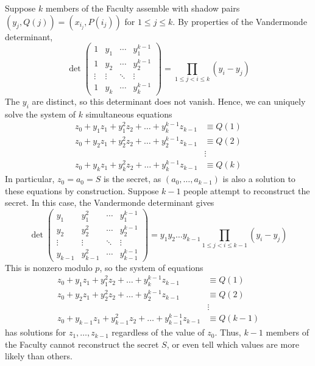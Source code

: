 Suppose \( k \) members of the Faculty assemble with shadow pairs \( (y_j, Q(j)) = (x_{i_j}, P(i_j)) \) for \( 1 \leq j \leq k \).
By properties of the Vandermonde determinant,
\[ \det\begin{pmatrix}
    1 & y_1 & \cdots & y_1^{k-1} \\
    1 & y_2 & \cdots & y_2^{k-1} \\
    \vdots & \vdots & \ddots & \vdots \\
    1 & y_k & \cdots & y_k^{k-1}
\end{pmatrix} = \prod_{1 \leq j < i \leq k} (y_i - y_j) \]
The \( y_i \) are distinct, so this determinant does not vanish.
Hence, we can uniquely solve the system of \( k \) simultaneous equations
\begin{align*}
    z_0 + y_1 z_1 + y_1^2 z_2 + \dots + y_k^{k-1} z_{k-1} &\equiv Q(1) \\
    z_0 + y_2 z_1 + y_2^2 z_2 + \dots + y_2^{k-1} z_{k-1} &\equiv Q(2) \\
    &\vdots \\
    z_0 + y_k z_1 + y_k^2 z_2 + \dots + y_k^{k-1} z_{k-1} &\equiv Q(k)
\end{align*}
In particular, \( z_0 = a_0 = S \) is the secret, as \( (a_0, \dots, a_{k-1}) \) is also a solution to these equations by construction.
Suppose \( k-1 \) people attempt to reconstruct the secret.
In this case, the Vandermonde determinant gives
\[ \det\begin{pmatrix}
    y_1 & y_1^2 & \cdots & y_1^{k-1} \\
    y_2 & y_2^2 & \cdots & y_2^{k-1} \\
    \vdots & \vdots & \ddots & \vdots \\
    y_{k-1} & y_{k-1}^2 & \cdots & y_{k-1}^{k-1}
\end{pmatrix} = y_1 y_2 \dots y_{k-1} \prod_{1 \leq j < i \leq k-1} (y_i - y_j) \]
This is nonzero modulo \( p \), so the system of equations
\begin{align*}
    z_0 + y_1 z_1 + y_1^2 z_2 + \dots + y_k^{k-1} z_{k-1} &\equiv Q(1) \\
    z_0 + y_2 z_1 + y_2^2 z_2 + \dots + y_2^{k-1} z_{k-1} &\equiv Q(2) \\
    &\vdots \\
    z_0 + y_{k-1} z_1 + y_{k-1}^2 z_2 + \dots + y_{k-1}^{k-1} z_{k-1} &\equiv Q(k-1)
\end{align*}
has solutions for \( z_1, \dots, z_{k-1} \) regardless of the value of \( z_0 \).
Thus, \( k - 1 \) members of the Faculty cannot reconstruct the secret \( S \), or even tell which values are more likely than others.

